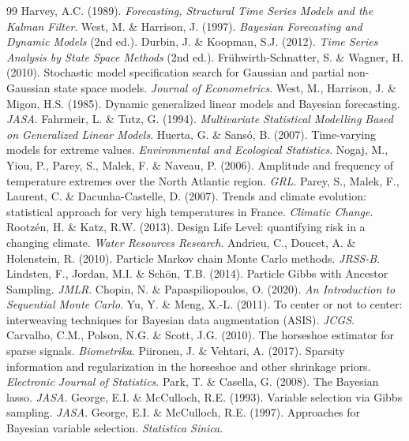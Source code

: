 \documentclass[11pt]{article}
\begin{document}
\begin{thebibliography}{99}
 Harvey, A.C. (1989). \emph{Forecasting, Structural Time Series Models and the Kalman Filter}.
 West, M. \& Harrison, J. (1997). \emph{Bayesian Forecasting and Dynamic Models} (2nd ed.).
 Durbin, J. \& Koopman, S.J. (2012). \emph{Time Series Analysis by State Space Methods} (2nd ed.).
 Fr\"uhwirth-Schnatter, S. \& Wagner, H. (2010). Stochastic model specification search for Gaussian and partial non-Gaussian state space models. \emph{Journal of Econometrics}.
 West, M., Harrison, J. \& Migon, H.S. (1985). Dynamic generalized linear models and Bayesian forecasting. \emph{JASA}.
 Fahrmeir, L. \& Tutz, G. (1994). \emph{Multivariate Statistical Modelling Based on Generalized Linear Models}.
 Huerta, G. \& Sans\'o, B. (2007). Time-varying models for extreme values. \emph{Environmental and Ecological Statistics}.
 Nogaj, M., Yiou, P., Parey, S., Malek, F. \& Naveau, P. (2006). Amplitude and frequency of temperature extremes over the North Atlantic region. \emph{GRL}.
 Parey, S., Malek, F., Laurent, C. \& Dacunha-Castelle, D. (2007). Trends and climate evolution: statistical approach for very high temperatures in France. \emph{Climatic Change}.
 Rootz\'en, H. \& Katz, R.W. (2013). Design Life Level: quantifying risk in a changing climate. \emph{Water Resources Research}.
 Andrieu, C., Doucet, A. \& Holenstein, R. (2010). Particle Markov chain Monte Carlo methods. \emph{JRSS-B}.
 Lindsten, F., Jordan, M.I. \& Sch\"on, T.B. (2014). Particle Gibbs with Ancestor Sampling. \emph{JMLR}.
 Chopin, N. \& Papaspiliopoulos, O. (2020). \emph{An Introduction to Sequential Monte Carlo}.
 Yu, Y. \& Meng, X.-L. (2011). To center or not to center: interweaving techniques for Bayesian data augmentation (ASIS). \emph{JCGS}.
 Carvalho, C.M., Polson, N.G. \& Scott, J.G. (2010). The horseshoe estimator for sparse signals. \emph{Biometrika}.
 Piironen, J. \& Vehtari, A. (2017). Sparsity information and regularization in the horseshoe and other shrinkage priors. \emph{Electronic Journal of Statistics}.
 Park, T. \& Casella, G. (2008). The Bayesian lasso. \emph{JASA}.
 George, E.I. \& McCulloch, R.E. (1993). Variable selection via Gibbs sampling. \emph{JASA}.
 George, E.I. \& McCulloch, R.E. (1997). Approaches for Bayesian variable selection. \emph{Statistica Sinica}.

\end{thebibliography}
\end{document}

